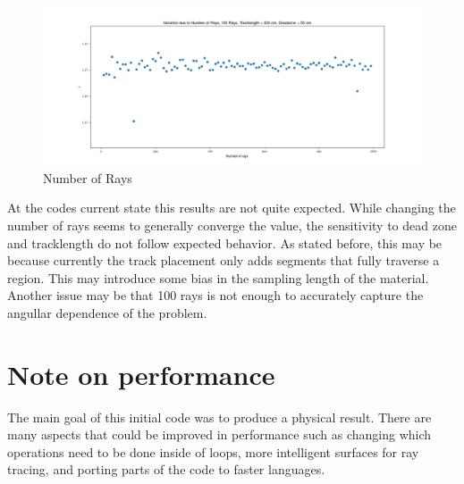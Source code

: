 \documentclass[10pt,letter]{article}
\begin{document}
\begin{figure}[H]
    \centering
    \includegraphics[width=1.2\textwidth]{figs/sensitivity_nrays.png}
    \caption{Number of Rays}
    \label{fig:5}
\end{figure}

At the codes current state this results are not quite expected. While changing the number of rays seems to generally converge the value, the sensitivity to dead zone and tracklength do not follow expected behavior. As stated before, this may be because currently the track placement only adds segments that fully traverse a region. This may introduce some bias in the sampling length of the material. Another issue may be that 100 rays is not enough to accurately capture the angullar dependence of the problem. 

\section*{Note on performance}
The main goal of this initial code was to produce a physical result. There are many aspects that could be improved in performance such as changing which operations need to be done inside of loops, more intelligent surfaces for ray tracing, and porting parts of the code to faster languages. 


\end{document}
